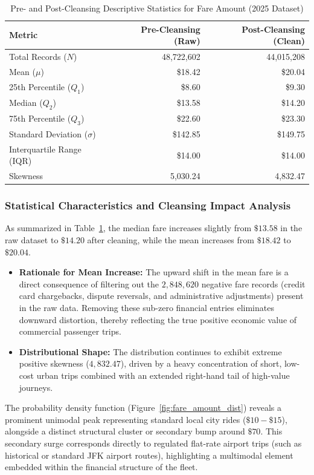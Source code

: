 \documentclass[11pt,a4paper]{article}
\begin{document}
\begin{table}[htbp]
\centering
\caption{Pre- and Post-Cleansing Descriptive Statistics for Fare Amount (2025 Dataset)}
\label{tab:stats_fare_amount_comparison}
\small
\begin{tabular}{lrr}
\toprule
\textbf{Metric} & \textbf{Pre-Cleansing (Raw)} & \textbf{Post-Cleansing (Clean)} \\
\midrule
Total Records ($N$) & 48,722,602 & 44,015,208 \\
Mean ($\mu$) & \$18.42 & \$20.04 \\
25th Percentile ($Q_1$) & \$8.60 & \$9.30 \\
Median ($Q_2$) & \$13.58 & \$14.20 \\
75th Percentile ($Q_3$) & \$22.60 & \$23.30 \\
Standard Deviation ($\sigma$) & \$142.85 & \$149.75 \\
Interquartile Range (IQR) & \$14.00 & \$14.00 \\
Skewness & 5,030.24 & 4,832.47 \\
\bottomrule
\end{tabular}
\end{table}

\subsubsection{Statistical Characteristics and Cleansing Impact Analysis}
As summarized in Table~\ref{tab:stats_fare_amount_comparison}, the median fare increases slightly from $\$13.58$ in the raw dataset to $\$14.20$ after cleaning, while the mean increases from $\$18.42$ to $\$20.04$. 
\begin{itemize}
    \item \textbf{Rationale for Mean Increase:} The upward shift in the mean fare is a direct consequence of filtering out the $2,848,620$ negative fare records (credit card chargebacks, dispute reversals, and administrative adjustments) present in the raw data. Removing these sub-zero financial entries eliminates downward distortion, thereby reflecting the true positive economic value of commercial passenger trips.
    \item \textbf{Distributional Shape:} The distribution continues to exhibit extreme positive skewness ($4,832.47$), driven by a heavy concentration of short, low-cost urban trips combined with an extended right-hand tail of high-value journeys. 
\end{itemize}

The probability density function (Figure~\ref{fig:fare_amount_dist}) reveals a prominent unimodal peak representing standard local city rides ($\$10-\$15$), alongside a distinct structural cluster or secondary bump around $\$70$. This secondary surge corresponds directly to regulated flat-rate airport trips (such as historical or standard JFK airport routes), highlighting a multimodal element embedded within the financial structure of the fleet.
\end{document}
